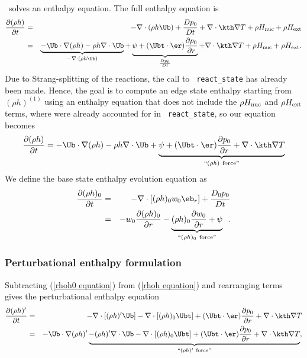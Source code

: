 \maestro\ solves an enthalpy equation.  
The full enthalpy equation is
\begin{eqnarray}
\frac{\partial(\rho h)}{\partial t} &=& -\nabla\cdot(\rho h \Ub) + \frac{Dp_0}{Dt} 
+ \nabla\cdot \kth \nabla T + \rho H_{\rm nuc} + \rho H_{\rm ext} \nonumber \\
&=& \underbrace{-\Ub\cdot\nabla(\rho h) - \rho h\nabla\cdot\Ub}_{-\nabla\cdot(\rho h\Ub)} 
+ \underbrace{\psi + (\Ubt \cdot \er) \frac{\partial p_0}{\partial r}}_{\frac{Dp_0}{Dt}} 
+ \nabla\cdot\kth\nabla T + \rho H_{\rm nuc} + \rho H_{\rm ext}.
\end{eqnarray}
Due to Strang-splitting of the reactions, the call to {\tt
  react\_state} has already been made.  Hence, the goal is to compute
an edge state enthalpy starting from $(\rho h)^{(1)}$ using an
enthalpy equation that does not include the $\rho H_{\rm nuc}$ and
$\rho H_{\rm ext}$ terms, where were already accounted for in {\tt
  react\_state}, so our equation becomes
\begin{equation}
\frac{\partial(\rho h)}{\partial t} = -\Ub\cdot\nabla(\rho h) - \rho h\nabla\cdot\Ub 
+ \underbrace{\psi + (\Ubt \cdot \er) \frac{\partial p_0}{\partial r} + \nabla\cdot\kth\nabla T}_{``(\rho h) ~ \text{force}"} \label{rhoh equation}
\end{equation}
We define the base state enthalpy evolution equation as
\begin{eqnarray}
\frac{\partial(\rho h)_0}{\partial t} &=& -\nabla\cdot[(\rho h)_0 w_0\eb_r] 
+ \frac{D_0p_0}{Dt} \nonumber \\
&=& -w_0\frac{\partial(\rho h)_0}{\partial r} 
- \underbrace{(\rho h)_0\frac{\partial w_0}{\partial r}+ \psi}_{``(\rho h)_0 ~ \text{force}"}
\enskip .\label{rhoh0 equation}
\end{eqnarray}

\subsubsection{Perturbational enthalpy formulation}

Subtracting (\ref{rhoh0 equation}) from (\ref{rhoh equation}) and
rearranging terms gives the perturbational enthalpy equation
\begin{eqnarray}
\frac{\partial(\rho h)'}{\partial t} &=& -\nabla\cdot[(\rho h)'\Ub] 
- \nabla\cdot[(\rho h)_0\Ubt] + (\Ubt \cdot \er)\frac{\partial p_0}{\partial r} 
+ \nabla\cdot\kth\nabla T\nonumber \\
&=& -\Ub\cdot\nabla(\rho h)' \underbrace{- (\rho h)'\nabla\cdot\Ub 
- \nabla\cdot[(\rho h)_0\Ubt] + (\Ubt \cdot \er)\frac{\partial p_0}{\partial r}
+ \nabla\cdot\kth\nabla T}_{``(\rho h)' ~ \text{force}"}, \label{rhohprime equation}
\end{eqnarray}

